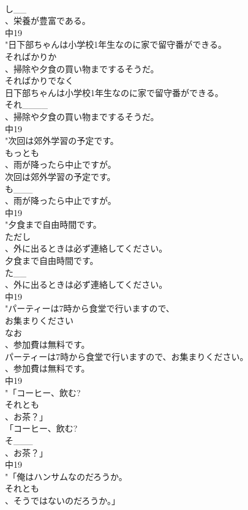 \documentclass[8pt]{extreport}
\begin{document}
\begin{CJK}{UTF8}{min}
\\	し__
\\	、栄養が豊富である。
\\	中19
\\	"日下部ちゃんは小学校1年生なのに家で留守番ができる。
\\	そればかりか
\\	、掃除や夕食の買い物までするそうだ。
\\	そればかりでなく
\\	日下部ちゃんは小学校1年生なのに家で留守番ができる。
\\	それ____
\\	、掃除や夕食の買い物までするそうだ。
\\	中19
\\	"次回は郊外学習の予定です。
\\	もっとも
\\	、雨が降ったら中止ですが。
\\	次回は郊外学習の予定です。
\\	も___
\\	、雨が降ったら中止ですが。
\\	中19
\\	"夕食まで自由時間です。
\\	ただし
\\	、外に出るときは必ず連絡してください。
\\	夕食まで自由時間です。
\\	た__
\\	、外に出るときは必ず連絡してください。
\\	中19
\\	"パーティーは7時から食堂で行いますので、
\\	お集まりください
\\	なお
\\	、参加費は無料です。
\\	パーティーは7時から食堂で行いますので、お集まりください。
\\	、参加費は無料です。
\\	中19
\\	"「コーヒー、飲む?
\\	それとも
\\	、お茶？」
\\	「コーヒー、飲む?
\\	そ___
\\	、お茶？」
\\	中19
\\	"「俺はハンサムなのだろうか。
\\	それとも
\\	、そうではないのだろうか。」

\end{CJK}
\end{document}
